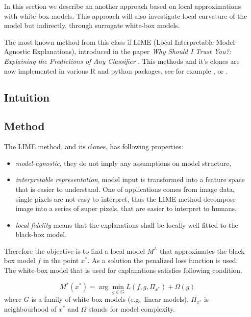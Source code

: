 \documentclass[]{krantz}
\providecommand{\tightlist}{%
  \setlength{\itemsep}{0pt}\setlength{\parskip}{0pt}}
\theoremstyle{definition}
\theoremstyle{definition}
\theoremstyle{definition}
\theoremstyle{remark}
\begin{document}
In this section we describe an another approach based on local
approximations with white-box models. This approach will also
investigate local curvature of the model but indirectly, through
surrogate white-box models.

The most known method from this class if LIME (Local Interpretable
Model-Agnostic Explanations), introduced in the paper \emph{Why Should I
Trust You?: Explaining the Predictions of Any Classifier} \citep{lime}.
This methods and it's clones are now implemented in various R and python
packages, see for example \citep{R-lime}, \citep{R-live} or
\citep{R-iml}.

\hypertarget{intuition-4}{%
\subsection{Intuition}\label{intuition-4}}

\hypertarget{method-4}{%
\subsection{Method}\label{method-4}}

The LIME method, and its clones, has following properties:

\begin{itemize}
\tightlist
\item
  \emph{model-agnostic}, they do not imply any assumptions on model
  structure,
\item
  \emph{interpretable representation}, model input is transformed into a
  feature space that is easier to understand. One of applications comes
  from image data, single pixels are not easy to interpret, thus the
  LIME method decompose image into a series of super pixels, that are
  easier to interpret to humans,
\item
  \emph{local fidelity} means that the explanations shall be locally
  well fitted to the black-box model.
\end{itemize}

Therefore the objective is to find a local model \(M^L\) that
approximates the black box model \(f\) in the point \(x^*\). As a
solution the penalized loss function is used. The white-box model that
is used for explanations satisfies following condition.

\[
M^*(x^*) = \arg \min_{g \in G} L(f, g, \Pi_{x^*}) + \Omega (g) 
\] where \(G\) is a family of white box models (e.g.~linear models),
\(\Pi_{x^*}\) is neighbourhood of \(x^*\) and \(\Omega\) stands for
model complexity.
\end{document}

